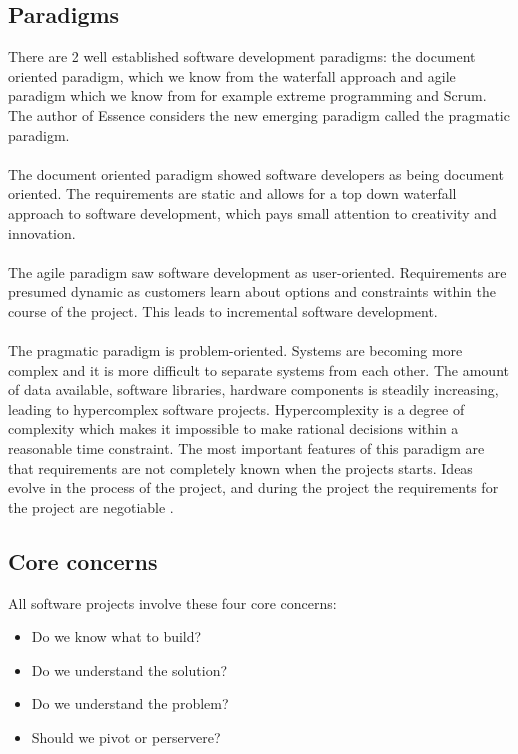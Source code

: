 \subsection{Paradigms}
There are 2 well established software development paradigms: the document oriented paradigm, which we know from the waterfall approach and agile paradigm which we know from for example extreme programming and Scrum.
The author of Essence considers the new emerging paradigm called the pragmatic paradigm.
\\\\
The document oriented paradigm showed software developers as being document oriented. 
The requirements are static and allows for a top down waterfall approach to software development, which pays small attention to creativity and innovation.
\\\\
The agile paradigm saw software development as user-oriented.
Requirements are presumed dynamic as customers learn about options and constraints within the course of the project.
This leads to incremental software development.
\\\\
The pragmatic paradigm is problem-oriented. 
Systems are becoming more complex and it is more difficult to separate systems from each other. 
The amount of data available, software libraries, hardware components is steadily increasing, leading to hypercomplex software projects.
Hypercomplexity is a degree of complexity which makes it impossible to make rational decisions within a reasonable time constraint.
The most important features of this paradigm are that requirements are not completely known when the projects starts.
Ideas evolve in the process of the project, and during the project the requirements for the project are negotiable \autocite{Essence}. 


\subsection{Core concerns}
All software projects involve these four core concerns:

\begin{itemize}
    \item Do we know what to build?
    \item Do we understand the solution?
    \item Do we understand the problem?
    \item Should we pivot or perservere?
\end{itemize}

